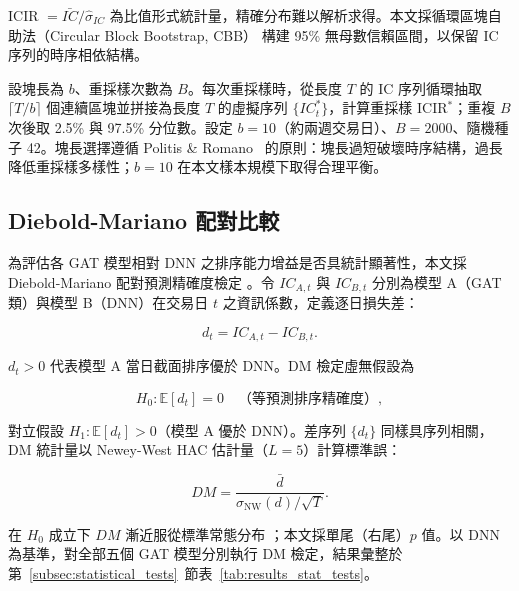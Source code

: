 ICIR $= \bar{IC}/\hat{\sigma}_{IC}$ 為比值形式統計量，精確分布難以解析求得。本文採循環區塊自助法（Circular Block Bootstrap, CBB）\cite{kunsch1989bootstrap} 構建 95\% 無母數信賴區間，以保留 IC 序列的時序相依結構。

設塊長為 $b$、重採樣次數為 $B$。每次重採樣時，從長度 $T$ 的 IC 序列循環抽取 $\lceil T/b \rceil$ 個連續區塊並拼接為長度 $T$ 的虛擬序列 $\{IC_t^*\}$，計算重採樣 ICIR$^*$；重複 $B$ 次後取 2.5\% 與 97.5\% 分位數。設定 $b = 10$（約兩週交易日）、$B = 2000$、隨機種子 42。塊長選擇遵循 Politis \& Romano~\cite{politis1994stationary} 的原則：塊長過短破壞時序結構，過長降低重採樣多樣性；$b = 10$ 在本文樣本規模下取得合理平衡。

\subsection{Diebold-Mariano 配對比較}
\label{subsec:dm_test_method}

為評估各 GAT 模型相對 DNN 之排序能力增益是否具統計顯著性，本文採 Diebold-Mariano 配對預測精確度檢定 \cite{diebold1995dm}。令 $IC_{A,t}$ 與 $IC_{B,t}$ 分別為模型 A（GAT 類）與模型 B（DNN）在交易日 $t$ 之資訊係數，定義逐日損失差：

\begin{equation}
d_t = IC_{A,t} - IC_{B,t}.
\end{equation}

$d_t > 0$ 代表模型 A 當日截面排序優於 DNN。DM 檢定虛無假設為

\begin{equation}
H_0: \mathbb{E}[d_t] = 0 \quad \text{（等預測排序精確度）},
\end{equation}

對立假設 $H_1: \mathbb{E}[d_t] > 0$（模型 A 優於 DNN）。差序列 $\{d_t\}$ 同樣具序列相關，DM 統計量以 Newey-West HAC 估計量（$L = 5$）計算標準誤：

\begin{equation}
DM = \frac{\bar{d}}{\hat{\sigma}_{\mathrm{NW}}(d) / \sqrt{T}}.
\end{equation}

在 $H_0$ 成立下 $DM$ 漸近服從標準常態分布 \cite{diebold1995dm}；本文採單尾（右尾）$p$ 值。以 DNN 為基準，對全部五個 GAT 模型分別執行 DM 檢定，結果彙整於第~\ref{subsec:statistical_tests}~節表~\ref{tab:results_stat_tests}。
